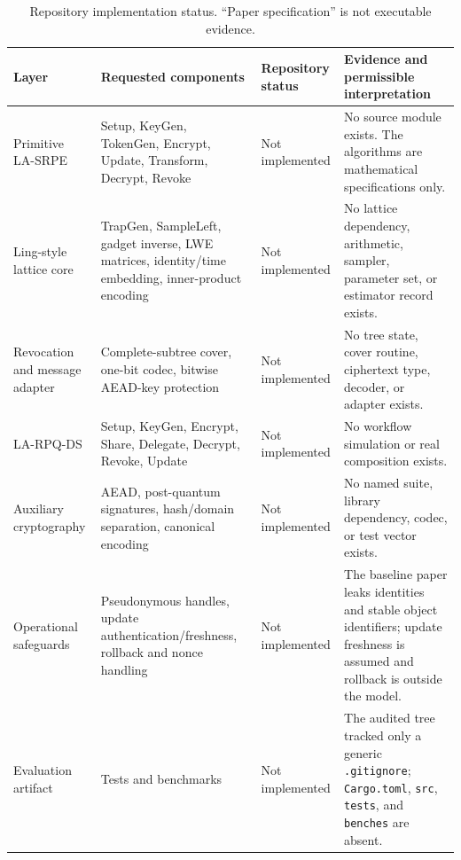 
\begin{table}[t]
\caption{Repository implementation status. ``Paper specification'' is not executable evidence.}
\label{tab:repo-implementation-status}
\centering
\small
\begin{tabular}{p{}p{}p{}p{}}
\toprule
Layer & Requested components & Repository status & Evidence and permissible interpretation \\
\midrule
Primitive LA-SRPE & Setup, KeyGen, TokenGen, Encrypt, Update, Transform, Decrypt, Revoke & Not implemented & No source module exists. The algorithms are mathematical specifications only. \\
Ling-style lattice core & TrapGen, SampleLeft, gadget inverse, LWE matrices, identity/time embedding, inner-product encoding & Not implemented & No lattice dependency, arithmetic, sampler, parameter set, or estimator record exists. \\
Revocation and message adapter & Complete-subtree cover, one-bit codec, bitwise AEAD-key protection & Not implemented & No tree state, cover routine, ciphertext type, decoder, or adapter exists. \\
LA-RPQ-DS & Setup, KeyGen, Encrypt, Share, Delegate, Decrypt, Revoke, Update & Not implemented & No workflow simulation or real composition exists. \\
Auxiliary cryptography & AEAD, post-quantum signatures, hash/domain separation, canonical encoding & Not implemented & No named suite, library dependency, codec, or test vector exists. \\
Operational safeguards & Pseudonymous handles, update authentication/freshness, rollback and nonce handling & Not implemented & The baseline paper leaks identities and stable object identifiers; update freshness is assumed and rollback is outside the model. \\
Evaluation artifact & Tests and benchmarks & Not implemented & The audited tree tracked only a generic \texttt{.gitignore}; \texttt{Cargo.toml}, \texttt{src}, \texttt{tests}, and \texttt{benches} are absent. \\
\bottomrule
\end{tabular}
\end{table}

